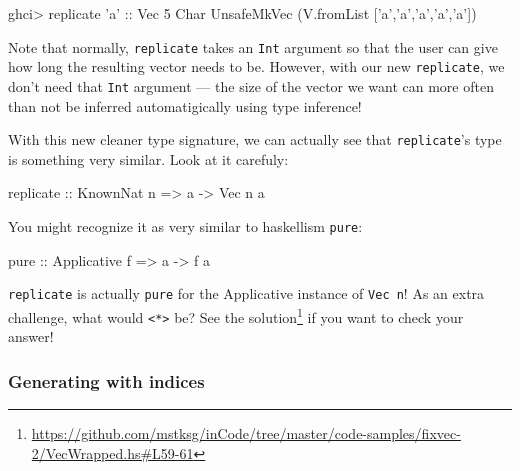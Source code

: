 \documentclass[]{article}
\newenvironment{Shaded}{}{}
\newcommand{\DataTypeTok}[1]{\textcolor[rgb]{0.56,0.13,0.00}{#1}}
\newcommand{\DecValTok}[1]{\textcolor[rgb]{0.25,0.63,0.44}{#1}}
\newcommand{\CharTok}[1]{\textcolor[rgb]{0.25,0.44,0.63}{#1}}
\newcommand{\OtherTok}[1]{\textcolor[rgb]{0.00,0.44,0.13}{#1}}
\newcommand{\FunctionTok}[1]{\textcolor[rgb]{0.02,0.16,0.49}{#1}}
\newcommand{\NormalTok}[1]{#1}
\renewcommand{\href}[2]{#2\footnote{\url{#1}}}
\begin{document}
\begin{Shaded}
\begin{Highlighting}[]
\NormalTok{ghci}\FunctionTok{>}\NormalTok{ replicate }\CharTok{'a'}\OtherTok{ ::} \DataTypeTok{Vec} \DecValTok{5} \DataTypeTok{Char}
\DataTypeTok{UnsafeMkVec}\NormalTok{ (V.fromList [}\CharTok{'a'}\NormalTok{,}\CharTok{'a'}\NormalTok{,}\CharTok{'a'}\NormalTok{,}\CharTok{'a'}\NormalTok{,}\CharTok{'a'}\NormalTok{])}
\end{Highlighting}
\end{Shaded}

Note that normally, \texttt{replicate} takes an \texttt{Int} argument so that
the user can give how long the resulting vector needs to be. However, with our
new \texttt{replicate}, we don't need that \texttt{Int} argument --- the size of
the vector we want can more often than not be inferred automatigically using
type inference!

With this new cleaner type signature, we can actually see that
\texttt{replicate}'s type is something very similar. Look at it carefuly:

\begin{Shaded}
\begin{Highlighting}[]
\NormalTok{replicate}\OtherTok{ ::} \DataTypeTok{KnownNat}\NormalTok{ n }\OtherTok{=>}\NormalTok{ a }\OtherTok{->} \DataTypeTok{Vec}\NormalTok{ n a}
\end{Highlighting}
\end{Shaded}

You might recognize it as very similar to haskellism \texttt{pure}:

\begin{Shaded}
\begin{Highlighting}[]
\NormalTok{pure}\OtherTok{ ::} \DataTypeTok{Applicative}\NormalTok{ f }\OtherTok{=>}\NormalTok{ a }\OtherTok{->}\NormalTok{ f a}
\end{Highlighting}
\end{Shaded}

\texttt{replicate} is actually \texttt{pure} for the Applicative instance of
\texttt{Vec\ n}! As an extra challenge, what would
\texttt{\textless{}*\textgreater{}} be? See
\href{https://github.com/mstksg/inCode/tree/master/code-samples/fixvec-2/VecWrapped.hs\#L59-61}{the
solution} if you want to check your answer!

\subsubsection{Generating with indices}\label{generating-with-indices}
\end{document}
